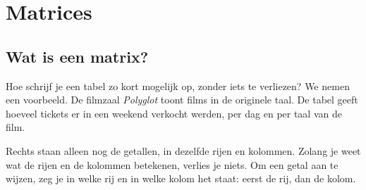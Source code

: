 
\section{Matrices}

\subsection{Wat is een matrix?}

Hoe schrijf je een tabel zo kort mogelijk op, zonder iets te verliezen? We nemen een voorbeeld. De filmzaal \textit{Polyglot} toont films in de originele taal. De tabel geeft hoeveel tickets er in een weekend verkocht werden, per dag en per taal van de film.


Rechts staan alleen nog de getallen, in dezelfde rijen en kolommen. Zolang je weet wat de rijen en de kolommen betekenen, verlies je niets. Om een getal aan te wijzen, zeg je in welke rij en in welke kolom het staat: eerst de rij, dan de kolom.


